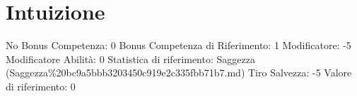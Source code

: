 \section{Intuizione}\label{intuizione}

\begin{description}
\tightlist
\item[Tags: ABI]
No Bonus Competenza: 0 Bonus Competenza di Riferimento: 1 Modificatore:
-5 Modificatore Abilità: 0 Statistica di riferimento: Saggezza
(Saggezza\%20bc9a5bbb3203450c919e2c335fbb71b7.md) Tiro Salvezza: -5
Valore di riferimento: 0
\end{description}
